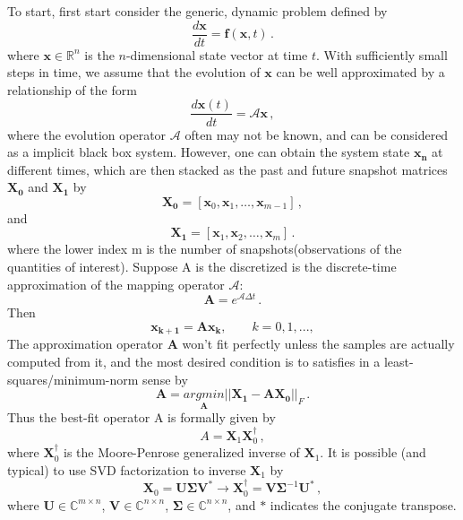 To start, first start consider the generic, dynamic problem defined by 
\begin{equation}
  \frac{d{\mathbf{x}}}{dt}=\mathbf{f}(\mathbf{x},t) \, .
  \label{eq:dynamic_problem}
\end{equation}
where $\mathbf{x} \in \mathbb{R}^{n}$ is the $n$-dimensional state vector at time $t$. 
With sufficiently small steps in time, we assume that the evolution of  $\mathbf{x}$ can be well approximated by a relationship of the form 
\begin{equation}
 \frac{d{\mathbf{x}}(t)}{dt}=\mathcal{A}\mathbf{x} \, ,
 \label{eq:linearized_model}
\end{equation}
where the evolution operator $\mathcal{A}$ often may not be known, and can be considered as a implicit black box system.
However, one can obtain the system state $\mathbf{x_n}$ at different times, which are then stacked as the past and future snapshot matrices $ \mathbf{X_0}$ and $ \mathbf{X_1}$ by
\begin{equation}
\label{eq:past_data}
\mathbf{X_0}=\left[ \mathbf{x}_0, \mathbf{x}_1, \ldots, \mathbf{x}_{m-1} \right] \, ,
\end{equation}
and
\begin{equation}
\label{eq:future_data}
\mathbf{X_1}=\left[ \mathbf{x}_1, \mathbf{x}_2, \ldots, \mathbf{x}_{m} \right] \, .
\end{equation}
where the lower index m is the number of snapshots(observations of the quantities of interest).
Suppose A is the discretized is the discrete-time approximation of the mapping operator $\mathcal{A}$:
\begin{equation}
\label{eq:A}
\mathbf{A} = e^{\mathcal{A} \Delta t} \, .
\end{equation}
Then 
\begin{equation}
\label{eq:x0x1}
\mathbf{x_{k+1}} = \mathbf{A} \mathbf{x_{k}}, \quad \quad k = 0,1,...,
\end{equation}
The approximation operator $\mathbf{A}$ won't fit perfectly unless the samples are actually computed from it, and the most desired condition is to satisfies in a least-squares/minimum-norm sense by
\begin{equation}
\label{eq:least}
\mathbf{A} =  \underset{\mathbf{A}}{argmin} ||\mathbf{X_1} - \mathbf{A} \mathbf{X_0}||_F \, .
\end{equation}
Thus the best-fit operator A is formally given by 
\begin{equation}
\label{eq:fullA}
A = \mathbf{X}_1 \mathbf{X}_0^{\dagger} \, ,
\end{equation}
where $\mathbf{X}_0^{\dagger}$ is the Moore-Penrose generalized inverse of $\mathbf{X}_1$.
It is possible (and typical) to use SVD factorization to inverse $\mathbf{X}_1$ by
\begin{equation}
\label{eq:svd}
\mathbf{X}_0 = \mathbf{U} \bm{\Sigma} \mathbf{V}^{*} \rightarrow \mathbf{X}_0^{\dagger} = \mathbf{V} \bm{\Sigma}^{-1} \mathbf{U}^* \, ,
\end{equation}
where $\mathbf{U} \in \mathbb{C}^{m\times n}$, $\mathbf{V} \in \mathbb{C}^{n\times n}$, $\bm{\Sigma} \in \mathbb{C}^{n\times n}$, and $*$ indicates the conjugate transpose. 


